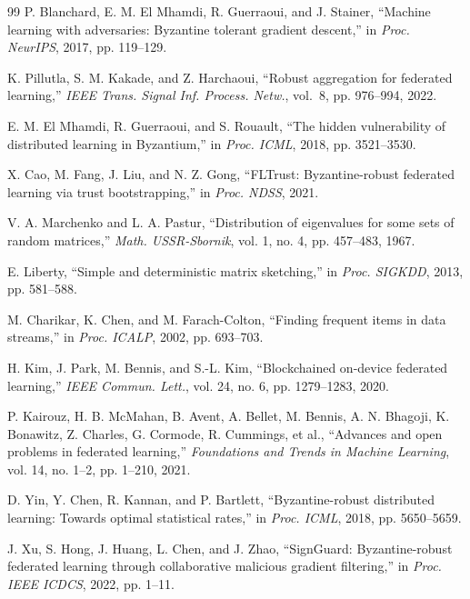 \begin{thebibliography}{99}
 P. Blanchard, E. M. El Mhamdi, R. Guerraoui, and J. Stainer, ``Machine learning with adversaries: Byzantine tolerant gradient descent,'' in \textit{Proc. NeurIPS}, 2017, pp. 119--129.

 K. Pillutla, S. M. Kakade, and Z. Harchaoui, ``Robust aggregation for federated learning,'' \textit{IEEE Trans. Signal Inf. Process. Netw.}, vol.~8, pp. 976--994, 2022.

 E. M. El Mhamdi, R. Guerraoui, and S. Rouault, ``The hidden vulnerability of distributed learning in Byzantium,'' in \textit{Proc. ICML}, 2018, pp. 3521--3530.

 X. Cao, M. Fang, J. Liu, and N. Z. Gong, ``FLTrust: Byzantine-robust federated learning via trust bootstrapping,'' in \textit{Proc. NDSS}, 2021.

 V. A. Marchenko and L. A. Pastur, ``Distribution of eigenvalues for some sets of random matrices,'' \textit{Math. USSR-Sbornik}, vol. 1, no. 4, pp. 457--483, 1967.

 E. Liberty, ``Simple and deterministic matrix sketching,'' in \textit{Proc. SIGKDD}, 2013, pp. 581--588.

 M. Charikar, K. Chen, and M. Farach-Colton, ``Finding frequent items in data streams,'' in \textit{Proc. ICALP}, 2002, pp. 693--703.

 H. Kim, J. Park, M. Bennis, and S.-L. Kim, ``Blockchained on-device federated learning,'' \textit{IEEE Commun. Lett.}, vol. 24, no. 6, pp. 1279--1283, 2020.

 P. Kairouz, H. B. McMahan, B. Avent, A. Bellet, M. Bennis, A. N. Bhagoji, K. Bonawitz, Z. Charles, G. Cormode, R. Cummings, et al., ``Advances and open problems in federated learning,'' \textit{Foundations and Trends in Machine Learning}, vol. 14, no. 1--2, pp. 1--210, 2021.

 D. Yin, Y. Chen, R. Kannan, and P. Bartlett, ``Byzantine-robust distributed learning: Towards optimal statistical rates,'' in \textit{Proc. ICML}, 2018, pp. 5650--5659.

 J. Xu, S. Hong, J. Huang, L. Chen, and J. Zhao, ``SignGuard: Byzantine-robust federated learning through collaborative malicious gradient filtering,'' in \textit{Proc. IEEE ICDCS}, 2022, pp. 1--11.


\end{thebibliography}
